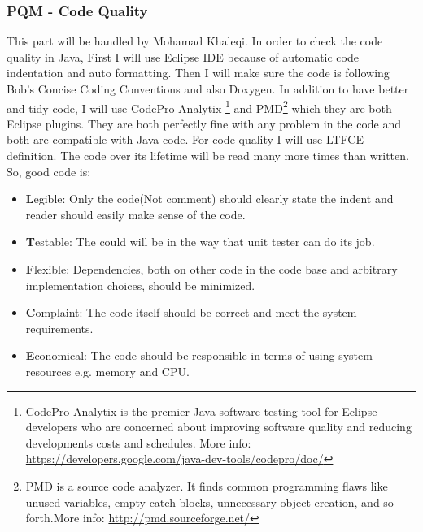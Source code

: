 \documentclass{article}
\begin{document}
\subsubsection{PQM - Code Quality}
This part will be handled by Mohamad Khaleqi. In order to check the code quality in Java, First I will use Eclipse IDE because of automatic code indentation and auto formatting. Then I will make sure the code is following Bob's Concise Coding Conventions and also Doxygen. In addition to have better and tidy code, I will use CodePro Analytix \footnote{CodePro Analytix is the premier Java software testing tool for Eclipse developers who are concerned about improving software quality and reducing developments costs and schedules. More info: \url{https://developers.google.com/java-dev-tools/codepro/doc/}} and PMD\footnote{ PMD is a source code analyzer. It finds common programming flaws like unused variables, empty catch blocks, unnecessary object creation, and so forth.More info: \url{http://pmd.sourceforge.net/}} which they are both Eclipse plugins. They are both perfectly fine with any problem in the code and both are compatible with Java code. For code quality I will use LTFCE definition. The code over its lifetime will be read many more times than written. So, good code is: 
\begin{itemize}
 \item \textbf{L}egible: Only the code(Not comment) should clearly state the indent and reader should easily make sense of the code.
 \item \textbf{T}estable: The could will be in the way that unit tester can do its job.
 \item \textbf{F}lexible: Dependencies, both on other code in the code base and arbitrary implementation choices, should be minimized.
 \item \textbf{C}omplaint: The code itself should be correct and meet the system requirements.
 \item \textbf{E}conomical: The code should be responsible in terms of using system resources e.g. memory and CPU.
 
\end{itemize}
\end{document}
